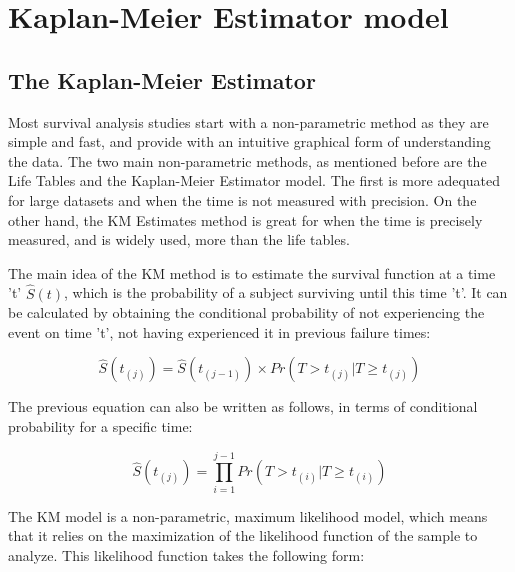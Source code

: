 \documentclass[11pt]{book} %
\begin{document}
  \section{Kaplan-Meier Estimator model}

    \subsection{The Kaplan-Meier Estimator}


    Most survival analysis studies start with a non-parametric method as they are simple and fast, and provide with an intuitive graphical form of understanding the data. The two main non-parametric methods, as mentioned before are the Life Tables and the Kaplan-Meier Estimator model. The first is more adequated for large datasets and when the time is not measured with precision. On the other hand, the KM Estimates method is great for when the time is precisely measured, and is widely used, more than the life tables.

    The main idea of the KM method is to estimate the survival function at a time 't' $\widehat{S}(t)$, which is the probability of a subject surviving until this time 't'. It can be calculated by obtaining the conditional probability of not experiencing the event on time 't', not having experienced it in previous failure times:

    \begin{equation}
      \widehat{S}(t_{(j)}) = \widehat{S}(t_{(j-1)}) \times Pr(T>t_{(j)}|T \geq t_{(j)})
      \label{eq:KM-eq-surv}
    \end{equation}

    The previous equation can also be written as follows, in terms of conditional probability for a specific time:

    \begin{equation}
      \widehat{S}(t_{(j)}) = \prod_{i=1}^{j-1} Pr(T>t_{(i)}|T\geq t_{(i)})
      \label{eq:KM-eq-probab}
    \end{equation}

    The KM model is a non-parametric, maximum likelihood model, which means that it relies on the maximization of the likelihood function of the sample to analyze. This likelihood function takes the following form:
\end{document}
